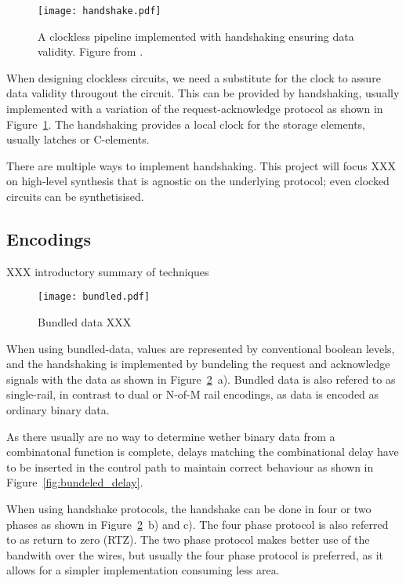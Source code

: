 \begin{figure}[htbp]
  \centering
  \texttt{[image: handshake.pdf]}
  \caption{A clockless pipeline implemented with handshaking ensuring
    data validity. Figure from \cite{sparso}.}
  \label{fig:handshake}
\end{figure}

When designing clockless circuits, we need a substitute for the clock
to assure data validity througout the circuit. This can be provided by
handshaking, usually implemented with a variation of the
request-acknowledge protocol as shown in
Figure~\ref{fig:handshake}. The handshaking provides a local clock for
the storage elements, usually latches or C-elements.

There are multiple ways to implement handshaking. This project will
focus XXX on high-level synthesis that is agnostic on the underlying
protocol; even clocked circuits can be synthetisised. 

\subsection{Encodings}

XXX introductory summary of techniques

\begin{figure}[htbp]
  \centering
  \texttt{[image: bundled.pdf]}
  \caption{Bundled data XXX}
  \label{fig:bundled}
\end{figure}

When using bundled-data, values are represented by conventional
boolean levels, and the handshaking is implemented by bundeling the
request and acknowledge signals with the data as shown in
Figure~\ref{fig:bundled}~a). Bundled data is also refered to as
single-rail, in contrast to dual or N-of-M rail encodings, as data is
encoded as ordinary binary data.

As there usually are no way to determine wether binary data from a
combinatonal function is complete, delays matching the combinational
delay have to be inserted in the control path to maintain correct
behaviour as shown in Figure~\ref{fig:bundeled_delay}.

When using handshake protocols, the handshake can be done in four or
two phases as shown in Figure~\ref{fig:bundled}~b) and c). The four
phase protocol is also referred to as return to zero (RTZ). The two
phase protocol makes better use of the bandwith over the wires, but
usually the four phase protocol is preferred, as it allows for a
simpler implementation consuming less area.

